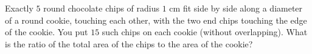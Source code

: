 Exactly $5$ round chocolate chips of radius $1$ cm fit side by side along a diameter of a round cookie, touching each other, with the two end chips touching the edge of the cookie. You put $15$ such chips on each cookie (without overlapping). What is the ratio of the total area of the chips to the area of the cookie?
